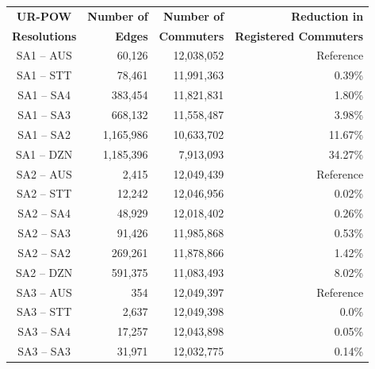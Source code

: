 \documentclass{article}
\begin{document}
\begin{appendices}
\begin{table}[ht]
\centering
\def\arraystretch{1.2}
\begin{tabular}{|c|r|r|r|}
\hline
\rowcolor[HTML]{C0C0C0} \textbf{UR-POW} & \multicolumn{1}{r|}{\cellcolor[HTML]{C0C0C0}\textbf{Number of}} & \multicolumn{1}{r|}{\cellcolor[HTML]{C0C0C0}\textbf{Number of}} & \multicolumn{1}{r|}{\cellcolor[HTML]{C0C0C0}\textbf{Reduction in}} \\ 
\rowcolor[HTML]{C0C0C0} \textbf{Resolutions} & \multicolumn{1}{r|}{\cellcolor[HTML]{C0C0C0}\textbf{Edges}} & \multicolumn{1}{r|}{\cellcolor[HTML]{C0C0C0}\textbf{Commuters}} & \multicolumn{1}{r|}{\cellcolor[HTML]{C0C0C0}\textbf{Registered Commuters}} \\
\hline
SA1 -- AUS   &   60,126      &   12,038,052      &       Reference       \\ 
SA1 -- STT   &   78,461      &   11,991,363      &       0.39\%          \\
SA1 -- SA4   &   383,454     &   11,821,831      &       1.80\%          \\
SA1 -- SA3   &   668,132     &   11,558,487      &       3.98\%          \\
SA1 -- SA2   &   1,165,986   &   10,633,702      &       11.67\%         \\
SA1 -- DZN   &   1,185,396   &   7,913,093       &       34.27\%         \\
\hline
SA2 -- AUS   &   2,415       &   12,049,439      &       Reference       \\
SA2 -- STT   &   12,242      &   12,046,956      &       0.02\%          \\
SA2 -- SA4   &   48,929      &   12,018,402      &       0.26\%          \\
SA2 -- SA3   &   91,426      &   11,985,868      &       0.53\%          \\
SA2 -- SA2   &   269,261     &   11,878,866      &       1.42\%          \\
SA2 -- DZN   &   591,375     &   11,083,493      &       8.02\%          \\
\hline
SA3 -- AUS   &   354         &   12,049,397      &       Reference       \\
SA3 -- STT   &   2,637       &   12,049,398      &       0.0\%           \\
SA3 -- SA4   &   17,257      &   12,043,898      &       0.05\%          \\
SA3 -- SA3   &   31,971      &   12,032,775      &       0.14\%          \\

\end{tabular}
\end{table}
\end{appendices}
\end{document}
